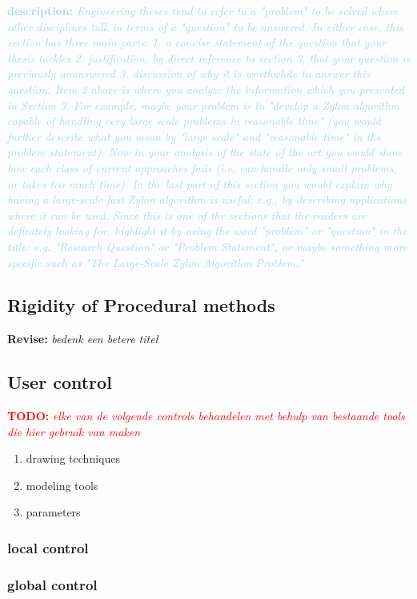 \documentclass{article}
\newcommand{\todo}[1]{\textcolor{red}{\textbf{\newline TODO: }\it{#1} \newline}}
\newcommand{\revise}[1]{\textcolor{myOrange}{\textbf{\newline Revise: }\it{#1}}}
\newcommand{\desc}[1]{\textcolor{lightblue}{\textbf{\newline description: }\it{#1} \newline}}
\begin{document}
\desc{
Engineering theses tend to refer to a "problem" to be solved where other disciplines talk in terms of a "question" to be answered. In either case, this section has three main parts:
1. a concise statement of the question that your thesis tackles
2. justification, by direct reference to section 3, that your question is previously unanswered
3. discussion of why it is worthwhile to answer this question.
Item 2 above is where you analyze the information which you presented in Section 3. For example, maybe your problem is to "develop a Zylon algorithm capable of handling very large scale problems in reasonable time" (you would further describe what you mean by "large scale" and "reasonable time" in the problem statement). Now in your analysis of the state of the art you would show how each class of current approaches fails (i.e. can handle only small problems, or takes too much time). In the last part of this section you would explain why having a large-scale fast Zylon algorithm is useful; e.g., by describing applications where it can be used.
Since this is one of the sections that the readers are definitely looking for, highlight it by using the word "problem" or "question" in the title: e.g. "Research Question" or "Problem Statement", or maybe something more specific such as "The Large-Scale Zylon Algorithm Problem." 
}

\subsection{Rigidity of Procedural methods} 
\revise{bedenk een betere titel}

\subsection{User control} 

\todo{elke van de volgende controls behandelen met behulp van bestaande tools die hier gebruik van maken}
\begin{enumerate}
\item drawing techniques
\item modeling tools
\item parameters
\end{enumerate}


\subsubsection{local control}


\subsubsection{global control}
\end{document}
